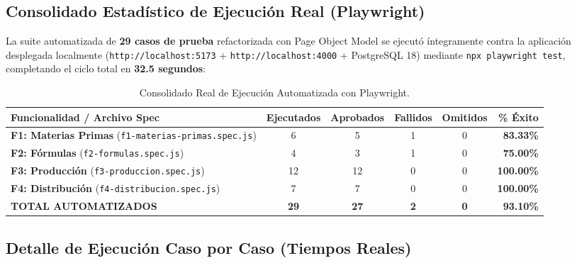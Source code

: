 \documentclass[11pt,a4paper]{article}
\begin{document}
\subsection{Consolidado Estadístico de Ejecución Real (Playwright)}
La suite automatizada de \textbf{29 casos de prueba} refactorizada con Page Object Model se ejecutó íntegramente contra la aplicación desplegada localmente (\texttt{http://localhost:5173} + \texttt{http://localhost:4000} + PostgreSQL 18) mediante \texttt{npx playwright test}, completando el ciclo total en \textbf{32.5 segundos}:

\begin{table}[htbp]
\centering
\small
\begin{tabularx}{\textwidth}{X c c c c r}
\toprule
\textbf{Funcionalidad / Archivo Spec} & \textbf{Ejecutados} & \textbf{Aprobados} & \textbf{Fallidos} & \textbf{Omitidos} & \textbf{\% Éxito} \\
\midrule
\textbf{F1: Materias Primas} (\texttt{f1-materias-primas.spec.js}) & 6 & 5 & 1 & 0 & \textbf{83.33\%} \\
\textbf{F2: Fórmulas} (\texttt{f2-formulas.spec.js}) & 4 & 3 & 1 & 0 & \textbf{75.00\%} \\
\textbf{F3: Producción} (\texttt{f3-produccion.spec.js}) & 12 & 12 & 0 & 0 & \textbf{100.00\%} \\
\textbf{F4: Distribución} (\texttt{f4-distribucion.spec.js}) & 7 & 7 & 0 & 0 & \textbf{100.00\%} \\
\midrule
\textbf{TOTAL AUTOMATIZADOS} & \textbf{29} & \textbf{27} & \textbf{2} & \textbf{0} & \textbf{93.10\%} \\
\bottomrule
\end{tabularx}
\caption{Consolidado Real de Ejecución Automatizada con Playwright.}\label{tab:resumen_playwright}
\end{table}

\subsection{Detalle de Ejecución Caso por Caso (Tiempos Reales)}
\end{document}

